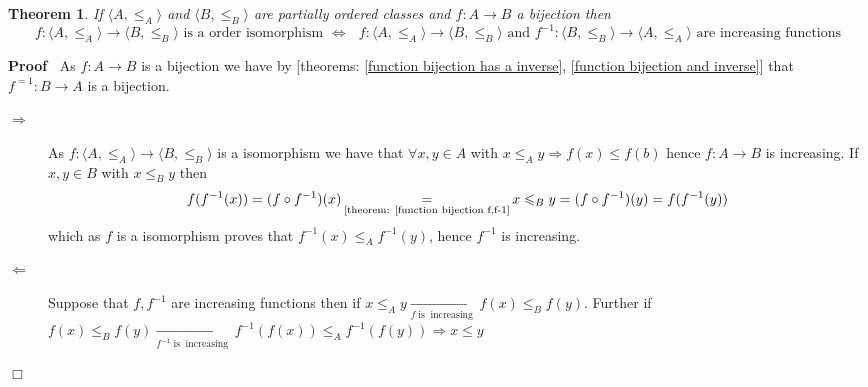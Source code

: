 \documentclass{book}
\newcommand{\Rightarrowlim}{\mathop{\rightarrow}\limits}
\newcommand{\equallim}{\mathop{=}\limits}
\newcommand{\tmop}[1]{\ensuremath{\operatorname{#1}}}
\newenvironment{proof}{\noindent\textbf{Proof\ }}{\hspace*{\fill}$\Box$\medskip}
\newtheorem{theorem}{Theorem}
\begin{document}
\begin{theorem}
  \label{order condition for isomorphism}If $\langle A, \leqslant_A \rangle$
  and $\langle B, \leqslant_B \rangle$ are partially ordered classes and $f :
  A \rightarrow B$ a bijection then
  \[ f : \langle A, \leqslant_A \rangle \rightarrow \langle B, \leqslant_B
     \rangle \text{ is a order isomorphism } \Leftrightarrow \text{ } f :
     \langle A, \leqslant_A \rangle \rightarrow \langle B, \leqslant_B \rangle
     \text{ and } f^{- 1} : \langle B, \leqslant_B \rangle \rightarrow \langle
     A, \leqslant_A \rangle \text{ are increasing functions} \]
\end{theorem}

\begin{proof}
  As $f : A \rightarrow B$ is a bijection we have by [theorems: \ref{function
  bijection has a inverse}, \ref{function bijection and inverse}] that $f^{=
  1} : B \rightarrow A$ is a bijection.
  \begin{description}
    \item[$\Rightarrow$] As $f : \langle A, \leqslant_A \rangle \rightarrow
    \langle B, \leqslant_B \rangle$ is a isomorphism we have that $\forall x,
    y \in A$ with $x \leqslant_A y \Rightarrow f (x) \leqslant f (b)$ hence $f
    : A \rightarrow B$ is increasing. If $x, y \in B$ with $x \leqslant_B y$
    then
    \[ f (f^{- 1} (x)) = (f \circ f^{- 1}) (x) \equallim_{\text{[theorem:
       \ref{function bijection f,f-1}}} x \leqslant_B y = (f \circ f^{- 1})
       (y) = f (f^{- 1} (y)) \]
    which as $f$ is a isomorphism proves that $f^{- 1} (x) \leqslant_A f^{- 1}
    (y)$, hence $f^{- 1}$ is increasing.
    
    \item[$\Leftarrow$] Suppose that $f, f^{- 1}$ are increasing functions
    then if $x \leqslant_A y \Rightarrowlim_{f \tmop{is} \tmop{increasing}} f
    (x) \leqslant_B f (y)$. Further if $f (x) \leqslant_B f (y)
    \Rightarrowlim_{f^{- 1} \tmop{is} \tmop{increasing}} f^{- 1} (f (x))
    \leqslant_A f^{- 1} (f (y)) \Rightarrow x \leqslant y$
  \end{description}
\end{proof}
\end{document}
